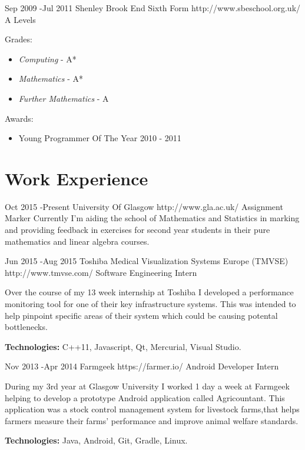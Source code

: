 \documentclass[10pt]{article} %
\begin{document}
\job
{Sep 2009 -}{Jul 2011}
{Shenley Brook End Sixth Form}
{http://www.sbeschool.org.uk/}
{A Levels}
{Grades:
\begin{itemize}[noitemsep]
\item{\textit{Computing} - A*}
\item{\textit{Mathematics} - A*}
\item{\textit{Further Mathematics} - A}
\end{itemize}
Awards:
\begin{itemize}[noitemsep]
\item{Young Programmer Of The Year 2010 - 2011}
\end{itemize}
}


\section{Work Experience}

\job
{Oct 2015 -}{Present}
{University Of Glasgow}
{http://www.gla.ac.uk/}
{Assignment Marker}
{Currently I'm aiding the school of Mathematics and Statistics in marking and providing feedback in exercises for second year students in 
 their pure mathematics and linear algebra courses.}


\job
{Jun 2015 -}{Aug 2015}
{Toshiba Medical Visualization Systems Europe (TMVSE)}
{http://www.tmvse.com/}
{Software Engineering Intern}
{Over the course of my 13 week internship at Toshiba I developed a performance monitoring tool for one of their key infrastructure systems. This was intended to help pinpoint specific areas of their system which could be causing potental bottlenecks.
\\
\rule{0mm}{5mm}\textbf{Technologies:} C++11, Javascript, Qt, Mercurial, Visual Studio.}


\job
{Nov 2013 -}{Apr 2014}
{Farmgeek}
{https://farmer.io/}
{Android Developer Intern}
{During my 3rd year at Glasgow University I worked 1 day a week at Farmgeek helping to develop a prototype Android application called Agricountant. This application was a stock control management system for livestock farms,that helps farmers measure their farms' performance and improve animal welfare standards.
\\
\rule{0mm}{5mm}\textbf{Technologies:} Java, Android, Git, Gradle, Linux.}
\end{document}

